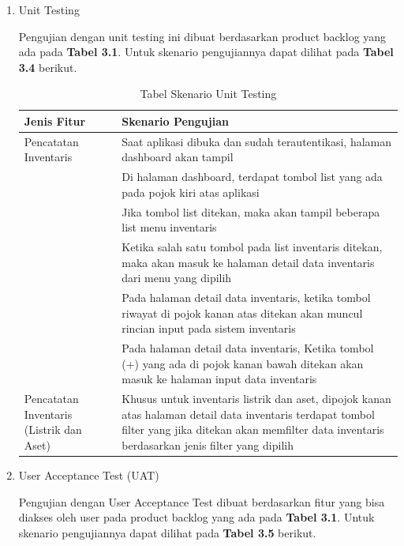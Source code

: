 \begin{enumerate}
	\item Unit Testing
	
	Pengujian dengan unit testing ini dibuat berdasarkan product backlog yang ada pada \textbf{Tabel 3.1}. Untuk skenario pengujiannya dapat dilihat pada \textbf{Tabel 3.4} berikut.

	\begin{table}[H]	
		\begin{center}
			\caption{Tabel Skenario Unit Testing}
			\label{tab:table8}
			\begin{tabular}{|m{13em}|m{17em}|}
			\hline
			\textbf{Jenis Fitur} & \textbf{Skenario Pengujian} \\
			\hline
			Pencatatan Inventaris & Saat aplikasi dibuka dan sudah terautentikasi, halaman dashboard akan tampil \\
			\hline
			 & Di halaman dashboard, terdapat tombol list yang ada pada pojok kiri atas aplikasi \\
			\hline
			 & Jika tombol list ditekan, maka akan tampil beberapa list menu inventaris \\
			\hline
			& Ketika salah satu tombol pada list inventaris ditekan, maka akan masuk ke halaman detail data inventaris dari menu yang dipilih \\
			\hline
			& Pada halaman detail data inventaris, ketika tombol riwayat di pojok kanan atas ditekan akan muncul rincian input pada sistem inventaris \\
			\hline
			& Pada halaman detail data inventaris, Ketika tombol (+) yang ada di pojok kanan bawah ditekan akan masuk ke halaman input data inventaris \\
			\hline
			Pencatatan Inventaris (Listrik dan Aset) & Khusus untuk inventaris listrik dan aset, dipojok kanan atas halaman detail data inventaris terdapat tombol filter yang jika ditekan akan memfilter data inventaris berdasarkan jenis filter yang dipilih  \\
			\hline
			\end{tabular}
		\end{center}
	\end{table}	

	\item User Acceptance Test (UAT)
	
	Pengujian dengan User Acceptance Test dibuat berdasarkan fitur yang bisa diakses oleh user pada product backlog yang ada pada \textbf{Tabel 3.1}. Untuk skenario pengujiannya dapat dilihat pada \textbf{Tabel 3.5} berikut.


\end{enumerate}
